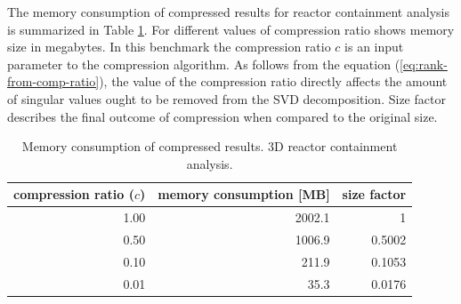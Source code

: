 The memory consumption of compressed results for reactor containment analysis is summarized in Table \ref{tab:mem-consum}. For different values of compression ratio shows memory size in megabytes. In this benchmark the compression ratio $c$ is an input parameter to the compression algorithm. As follows from the equation (\ref{eq:rank-from-comp-ratio}), the value of the compression ratio directly affects the amount of singular values ought to be removed from the SVD decomposition. Size factor describes the final outcome of compression when compared to the original size.

\begin{table}[H]
\centering
    \begin{tabular}{| r | r | r |}
    \hline
    compression ratio ($c$) & memory consumption [MB] & size factor \\ \hline \hline
    1.00 & 2002.1 & 1 \\ \hline
    0.50 & 1006.9 & 0.5002 \\ \hline
    0.10& 211.9 & 0.1053 \\ \hline
    0.01 & 35.3 & 0.0176 \\ \hline
    \end{tabular}
    \caption{Memory consumption of compressed results. 3D reactor containment analysis.}
	\label{tab:mem-consum}
\end{table}
